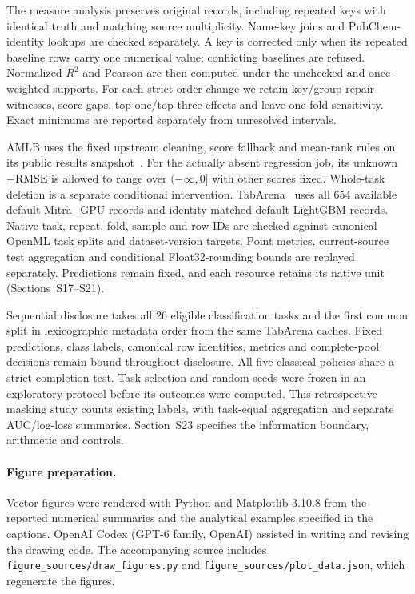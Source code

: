 \documentclass[preprint,12pt,number,sort&compress]{elsarticle}
\begin{document}
The measure analysis preserves original records, including repeated keys with identical truth and matching source multiplicity. Name-key joins and PubChem-identity lookups are checked separately. A key is corrected only when its repeated baseline rows carry one numerical value; conflicting baselines are refused. Normalized $R^2$ and Pearson are then computed under the unchecked and once-weighted supports. For each strict order change we retain key/group repair witnesses, score gaps, top-one/top-three effects and leave-one-fold sensitivity. Exact minimums are reported separately from unresolved intervals.

AMLB uses the fixed upstream cleaning, score fallback and mean-rank rules on its public results snapshot~\cite{gijsbers2024amlb}. For the actually absent regression job, its unknown $-\mathrm{RMSE}$ is allowed to range over $(-\infty,0]$ with other scores fixed. Whole-task deletion is a separate conditional intervention. TabArena~\cite{erickson2025tabarena} uses all 654 available default Mitra\_GPU records and identity-matched default LightGBM records. Native task, repeat, fold, sample and row IDs are checked against canonical OpenML task splits and dataset-version targets. Point metrics, current-source test aggregation and conditional Float32-rounding bounds are replayed separately. Predictions remain fixed, and each resource retains its native unit (Sections~S17--S21).

Sequential disclosure takes all 26 eligible classification tasks and the first common split in lexicographic metadata order from the same TabArena caches. Fixed predictions, class labels, canonical row identities, metrics and complete-pool decisions remain bound throughout disclosure. All five classical policies share a strict completion test. Task selection and random seeds were frozen in an exploratory protocol before its outcomes were computed. This retrospective masking study counts existing labels, with task-equal aggregation and separate AUC/log-loss summaries. Section~S23 specifies the information boundary, arithmetic and controls.

\paragraph{Figure preparation.}
Vector figures were rendered with Python and Matplotlib 3.10.8 from the reported numerical summaries and the analytical examples specified in the captions. OpenAI Codex (GPT-6 family, OpenAI) assisted in writing and revising the drawing code. The accompanying source includes \nolinkurl{figure_sources/draw_figures.py} and \nolinkurl{figure_sources/plot_data.json}, which regenerate the figures.
\end{document}
